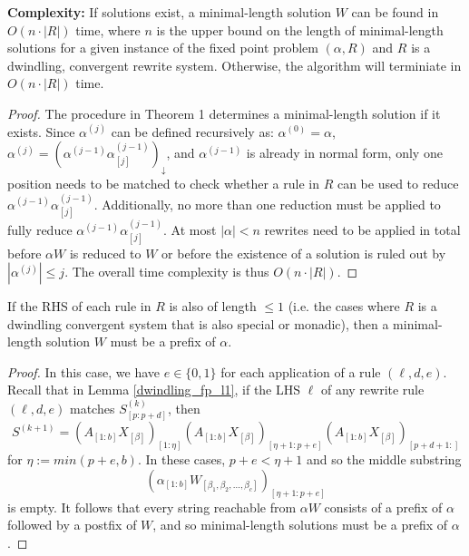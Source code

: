 \documentclass{lmcs} %
\theoremstyle{plain}\newtheorem{satz}[thm]{Satz} %
\begin{document}
\begin{thm} \textbf{Complexity:} If solutions exist, a minimal-length
solution $W$ can be found in $O(n \cdot |R|)$ time, where $n$ is the
upper bound on the length of minimal-length solutions for a given
instance of the fixed point problem $(\alpha,R)$ and $R$ is a
dwindling, convergent rewrite system. Otherwise, the algorithm will
terminiate in $O(n\cdot |R|)$ time.
\end{thm}

\begin{proof}
The procedure in Theorem 1 determines a minimal-length solution
if it exists. Since $\alpha^{(j)}$ can be defined recursively as:
$\alpha^{(0)}=\alpha$, $\alpha^{(j)} =
(\alpha^{(j-1)}\alpha_{[j]}^{(j-1)})_\downarrow$, and $\alpha^{(j-1)}$
is already in normal form, only one position needs to be matched to
check whether a rule in $R$ can be used to reduce
$\alpha^{(j-1)}\alpha_{[j]}^{(j-1)}$. Additionally, no more than one
reduction must be applied to fully reduce
$\alpha^{(j-1)}\alpha_{[j]}^{(j-1)}$.  At most $|\alpha|<n$ rewrites
need to be applied in total before $\alpha W$ is reduced to $W$ or
before the existence of a solution is ruled out by $|\alpha^{(j)}|\leq
j$. The overall time complexity is thus $O(n \cdot |R|)$. 
\end{proof}


\begin{cor} %
If the RHS of each rule in $R$ is also of length $\leq 1$ (i.e. the cases
where $R$ is a dwindling convergent system that is also special or
 monadic), then a minimal-length solution $W$ must be a prefix of
 $\alpha$.
 \end{cor} %
 \begin{proof} In this case, we have $e \in \{0,1\}$ for each
application of a rule $(\ell,d,e)$.  Recall that in Lemma
\ref{dwindling_fp_l1}, if the LHS $\ell$ of any rewrite rule
 $(\ell,d,e)$ matches $S^{(k)}_{[p:p+d]}$, then $$S^{(k+1)}=
(A_{[1:b]}X_{[\beta]})_{[1:\eta]}(A_{[1:b]}X_{[\beta]})_{[\eta+1:p+e]}(A_{[1:b]}X_{[\beta]})_{[p+d+1:]}$$
for $\eta := min(p+e,b)$. In these cases, $p+e < \eta + 1$ and so the
middle substring $$(\alpha_{[1:b]}W_{[\beta_1,\beta_2,\dots,\beta_c]})_{[\eta+1:p+e]}$$ is empty.
It follows that every string reachable from $\alpha W$ consists of a prefix of $\alpha$
followed by a postfix of $W$, and so minimal-length solutions must be a prefix of $\alpha$. 
\end{proof}
\end{document}
